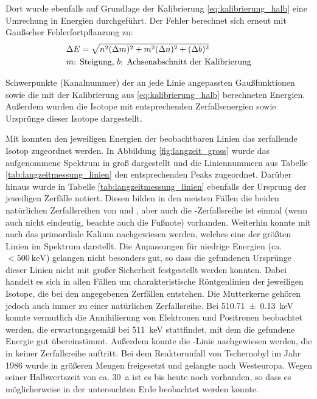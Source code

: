 \documentclass[11pt, a4paper]{article}
\numberwithin{equation}{section}
\newcommand{\cs}{\isotope[137]{Cs}}
\begin{document}
Dort wurde ebenfalls auf Grundlage der Kalibrierung \eqref{eq:kalibrierung_halb} eine Umrechung in Energien durchgeführt.
Der Fehler berechnet sich erneut mit Gaußscher Fehlerfortpflanzung zu:
\begin{align}
&\Delta E = \sqrt{n^2 (\Delta m)^2 + m^2 (\Delta n)^2 + (\Delta b)^2} \\
&\text{$m$: Steigung, $b$: Achsenabschnitt der Kalibrierung}\notag
\end{align}
\begin{table}
	\centering
	
	\caption{Schwerpunkte (Kanalnummer) der an jede Linie angepassten Gaußfunktionen sowie die mit der Kalibrierung aus \eqref{eq:kalibrierung_halb} berechneten Energien. Außerdem wurden die Isotope mit entsprechenden Zerfallsenergien sowie Ursprünge dieser Isotope dargestellt.}
	\label{tab:langzeitmessung_linien}
\end{table}
Mit \cite{gilmore} konnten den jeweiligen Energien der beobachtbaren Linien das zerfallende Isotop zugeordnet werden.
In Abbildung \ref{fig:langzeit_gross} wurde das aufgenommene Spektrum in groß dargestellt und die Liniennummern aus Tabelle \ref{tab:langzeitmessung_linien} den entsprechenden Peaks zugeordnet.
Darüber hinaus wurde in Tabelle \ref{tab:langzeitmessung_linien} ebenfalls der Ursprung der jeweiligen Zerfälle notiert.
Diesen bilden in den meisten Fällen die beiden natürlichen Zerfallsreihen von  und , aber auch die -Zerfallsreihe ist einmal (wenn auch nicht eindeutig, beachte auch die Fußnote) vorhanden.
Weiterhin konnte mit  auch das primordiale Kalium nachgewiesen werden, welches eine der größten Linien im Spektrum darstellt.
Die Anpassungen für niedrige Energien (ca. $<\SI{500}{\kilo\electronvolt}$) gelangen nicht besonders gut, so dass die gefundenen Ursprünge dieser Linien nicht mit großer Sicherheit festgestellt werden konnten.
Dabei handelt es sich in allen Fällen um charakteristische Röntgenlinien der jeweiligen Isotope, die bei den angegebenen Zerfällen entstehen.
Die Mutterkerne gehören jedoch auch immer zu einer natürlichen Zerfallsreihe.
Bei \SI{510.71+-0.13}{\kilo\electronvolt} konnte vermutlich die Annihilierung von Elektronen und Positronen beobachtet werden, die erwartungsgemäß bei \SI{511}{\kilo\electronvolt} stattfindet, mit dem die gefundene Energie gut übereinstimmt.
Außerdem konnte die \cs{}-Linie nachgewiesen werden, die in keiner Zerfallsreihe auftritt.
Bei dem Reaktorunfall von Tschernobyl im Jahr 1986 wurde \cs{} in größeren Mengen freigesetzt und gelangte nach Westeuropa.
Wegen seiner Halbwertszeit von ca. \SI{30}{a} ist es bis heute noch vorhanden, so dass es möglicherweise in der untersuchten Erde beobachtet werden konnte. 
\FloatBarrier
\end{document}
